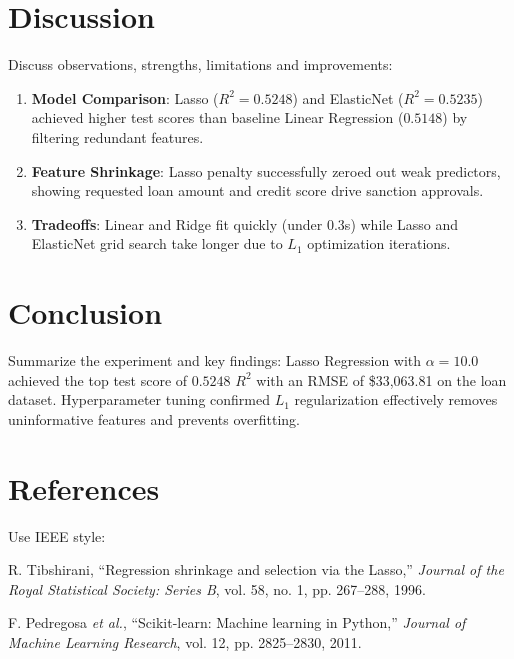 \documentclass[12pt,a4paper]{article}
\begin{document}
\section{Discussion}
Discuss observations, strengths, limitations and improvements:
\begin{enumerate}
\item \textbf{Model Comparison}: Lasso ($R^2 = 0.5248$) and ElasticNet ($R^2 = 0.5235$) achieved higher test scores than baseline Linear Regression ($0.5148$) by filtering redundant features.
\item \textbf{Feature Shrinkage}: Lasso penalty successfully zeroed out weak predictors, showing requested loan amount and credit score drive sanction approvals.
\item \textbf{Tradeoffs}: Linear and Ridge fit quickly (under 0.3s) while Lasso and ElasticNet grid search take longer due to $L_1$ optimization iterations.
\end{enumerate}

\section{Conclusion}
Summarize the experiment and key findings:
Lasso Regression with $\alpha = 10.0$ achieved the top test score of $0.5248$ $R^2$ with an RMSE of \$33,063.81 on the loan dataset. Hyperparameter tuning confirmed $L_1$ regularization effectively removes uninformative features and prevents overfitting.

\section{References}
Use IEEE style:
\begin{enumerate}[label={[\arabic*]}]
\item R. Tibshirani, ``Regression shrinkage and selection via the Lasso,'' \textit{Journal of the Royal Statistical Society: Series B}, vol. 58, no. 1, pp. 267--288, 1996.
\item F. Pedregosa \textit{et al.}, ``Scikit-learn: Machine learning in Python,'' \textit{Journal of Machine Learning Research}, vol. 12, pp. 2825--2830, 2011.
\end{enumerate}

\newpage

\end{document}
